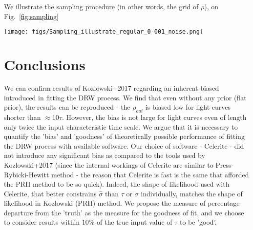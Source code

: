 \documentclass[fleqn,usenatbib]{mnras}  %
\begin{document}


We illustrate the sampling procedure (in other words, the grid of $\rho$), on Fig.~\ref{fig:sampling}



\begin{figure*}
\texttt{[image: figs/Sampling\_illustrate\_regular\_0-001\_noise.png]}
\caption{We illustrate the process of selecting different sections of a light curve, depending on the desired number of points N, and length of section : $\rho$.  From left to right, we sample $N \in {1000,200,60}$ points. Focusing on a single column, from top to bottom we sample on a logarithmic grid of $\rho$. The smallest $\rho$ is set by the maximum attainable light curve section, which corresponds to the full length $l = 100 \tau$, and since $\rho = 1 / l$, $\rho_{min} = 0.01$. The largest $\rho$ is related to the shortest possible light curve section conditional on the number of points chosen. Thus choosing $N \in {1000,200,60}$ days, the shortest possible sections are $l \in {1000,200,60}$ days given that we have adopted the $\Delta t = 1 $ day in 'true' light curve.}
\label{fig:sampling}
\end{figure*} 









\section{Conclusions}

We can confirm results of Kozlowski+2017 regarding an inherent biased introduced in fitting the DRW process. We find that even without any prior (flat prior), the results can be reproduced - the $\rho_{out}$ is biased low for light curves shorter than $\approx 10 \tau$.  However,  the bias is not large for light curves even of length only twice the input characteristic time scale. We argue that it is necessary to quantify the 'bias' and 'goodness' of  theoretically possible performance of  fitting the DRW process with available software. Our choice of software - Celerite - did not introduce any significant bias as compared to the tools used by Kozlowski+2017 (since the internal workings of Celerite are similar to Press-Rybicki-Hewitt method - the reason that Celerite is fast is the same that afforded the PRH method to be so quick). Indeed, the shape of likelihood used with Celerite, that better constrains $\hat{\sigma}$ than $\tau$ or $\sigma$  individually, matches the shape of likelihood in Kozlowski (PRH) method.  We propose the measure of percentage departure from the 'truth' as the measure for the goodness of fit,  and we choose  to consider results within $10 \%$ of the true input value of $\tau$ to be 'good'. 
\end{document}
